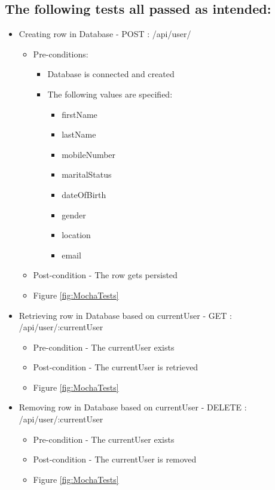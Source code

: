 \documentclass{article}
\begin{document}
\subsection{The following tests all passed as intended:}
\begin{itemize}
\item Creating row in Database - POST : /api/user/ 
	\begin{itemize}
	\item Pre-conditions:
		\begin{itemize}
		\item Database is connected and created
		\item The following values are specified:  
		\begin{itemize}
		\item firstName
  		\item lastName
  		\item mobileNumber 
  		\item maritalStatus 
  		\item dateOfBirth 
 		\item gender
  		\item location 
 		\item email
 		\end{itemize} 
		\end{itemize}
	\item Post-condition - The row gets persisted
	\item Figure \ref{fig:MochaTests}
	\end{itemize}
	
	
\item Retrieving row in Database based on currentUser - GET : /api/user/:currentUser
	\begin{itemize}
	\item Pre-condition - The currentUser exists
	\item Post-condition - The currentUser is retrieved 
	\item Figure \ref{fig:MochaTests}
	\end{itemize}
	
\item Removing row in Database based on currentUser - DELETE : /api/user/:currentUser
	\begin{itemize}
	\item Pre-condition - The currentUser exists
	\item Post-condition - The currentUser is removed 
	\item Figure \ref{fig:MochaTests}
	\end{itemize}	




\end{itemize}
\end{document}
